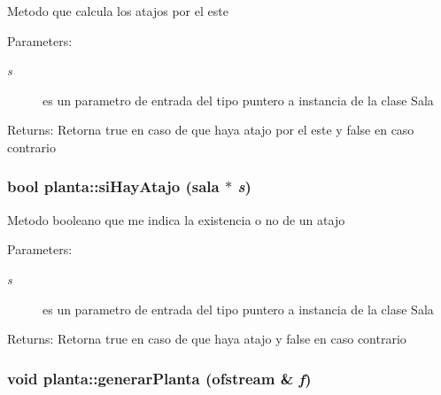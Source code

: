 Metodo que calcula los atajos por el este \begin{Desc}
\item[Parameters:]
\begin{description}
\item[{\em s}]es un parametro de entrada del tipo puntero a instancia de la clase Sala \end{description}
\end{Desc}
\begin{Desc}
\item[Returns:]Retorna true en caso de que haya atajo por el este y false en caso contrario \end{Desc}
\hypertarget{classplanta_6420d2f76781945da90ff6187967694d}{
\subsubsection[siHayAtajo]{\setlength{\rightskip}{0pt plus 5cm}bool planta::siHayAtajo ({\bf sala} $\ast$ {\em s})}}
\label{classplanta_6420d2f76781945da90ff6187967694d}


Metodo booleano que me indica la existencia o no de un atajo \begin{Desc}
\item[Parameters:]
\begin{description}
\item[{\em s}]es un parametro de entrada del tipo puntero a instancia de la clase Sala \end{description}
\end{Desc}
\begin{Desc}
\item[Returns:]Retorna true en caso de que haya atajo y false en caso contrario \end{Desc}
\hypertarget{classplanta_8fab738328778b64c683e169a2aa58dc}{
\subsubsection[generarPlanta]{\setlength{\rightskip}{0pt plus 5cm}void planta::generarPlanta (ofstream \& {\em f})}}
\label{classplanta_8fab738328778b64c683e169a2aa58dc}


